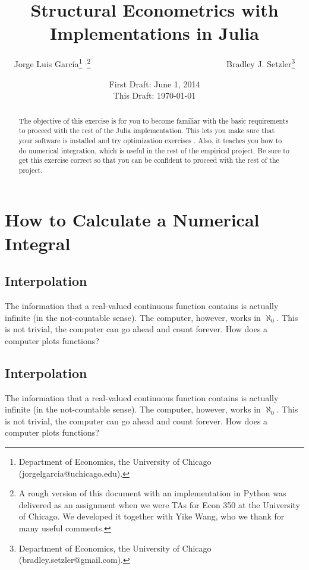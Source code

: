 



\title{\textbf{Structural Econometrics with Implementations in Julia}}
\author{Jorge Luis Garc\'{i}a\thanks{Department of Economics, the University of Chicago (jorgelgarcia@uchicago.edu).} $^{,}$\thanks{A rough version of this document with an implementation in Python was delivered as an assignment when we were TAs for Econ 350 at the University of Chicago. We developed it together with Yike Wang, who we thank for many useful comments.} \ \ \ \ \ \ \ \ \ \ \ \ \ \ \ \ \ \ \ \ \ \ \ \ \ \ \ \ \ \ \ \ Bradley J. Setzler\thanks{Department of Economics, the University of Chicago (bradley.setzler@gmail.com).}}
\date{First Draft: June 1, 2014 \\ This Draft: \today}
\maketitle

\begin{abstract}
\noindent The objective of this exercise is for you to become familiar with the basic requirements to proceed with the rest of the Julia implementation. This lets you make sure that your software is installed and try optimization exercises . Also, it teaches you how to do numerical integration, which is useful in the rest of the empirical project. Be sure to get this exercise correct so that you can be confident to proceed with the rest of the project. 
\end{abstract}

\section{How to Calculate a Numerical Integral}

\subsection{Interpolation}
The information that a real-valued continuous function contains is actually infinite (in the not-countable sense). The computer, however, works in $\aleph_{0}$. This is not trivial, the computer can go ahead and count forever. How does a computer plots functions?
\subsection{Interpolation}
The information that a real-valued continuous function contains is actually infinite (in the not-countable sense). The computer, however, works in $\aleph_{0}$. This is not trivial, the computer can go ahead and count forever. How does a computer plots functions?

